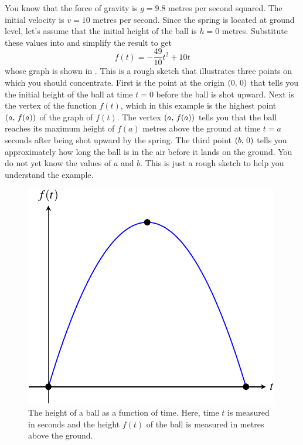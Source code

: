 \documentclass[a4paper,oneside,12pt]{article}
\begin{document}
\begin{solution}
You know that the force of gravity is $g = 9.8$ metres per second
squared.  The initial velocity is $v = 10$ metres per second.  Since
the spring is located at ground level, let's assume that the initial
height of the ball is $h = 0$ metres.  Substitute these values into
 and simplify the
result to get
\[
f(t)
=
-\frac{49}{10}t^2 + 10t
\]
whose graph is shown in .  This is a
rough sketch that illustrates three points on which you should
concentrate.  First is the point at the origin $\left\lparen{0},\, {0}\right\rparen$ that
tells you the initial height of the ball at time $t = 0$ before the
ball is shot upward.  Next is the vertex of the function $f(t)$, which
in this example is the highest point $\left\lparen{a},\, {f(a)}\right\rparen$ of the graph of
$f(t)$.  The vertex $\left\lparen{a},\, {f(a)}\right\rparen$ tells you that the ball reaches
its maximum height of $f(a)$ metres above the ground at time $t = a$
seconds after being shot upward by the spring.  The third point
$\left\lparen{b},\, {0}\right\rparen$ tells you approximately how long the ball is in the air
before it lands on the ground.  You do not yet know the values of $a$
and $b$.  This is just a rough sketch to help you understand the
example.

\begin{figure}[!htbp]
\centering
\includegraphics[scale=1.2]{image/09/spring-ball.pdf}
\caption{%
  The height of a ball as a function of time.  Here, time $t$ is
  measured in seconds and the height $f(t)$ of the ball is measured in
  metres above the ground.
}
\label{fig:spring_ball_graph}
\end{figure}


\end{solution}
\end{document}
